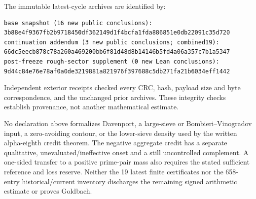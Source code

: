 \documentclass[11pt,a4paper]{article}
\theoremstyle{definition}
\theoremstyle{remark}
\begin{document}
The immutable latest-cycle archives are identified by:
\begin{lstlisting}
base snapshot (16 new public conclusions):
3b88e4f9367fb2b9718450df362149d1f4bcfa1fda886851e0db22091c35d720
continuation addendum (3 new public conclusions; combined19):
66dc5eecb878c78a260a469200bb6f81d48d8b14146b5fd4a06a357c7b1a5347
post-freeze rough-sector supplement (0 new Lean conclusions):
9d44c84e76e78af0a0de3219881a821976f397688c5db271fa21b6034eff1442
\end{lstlisting}
Independent exterior receipts checked every CRC, hash, payload size and
byte correspondence, and the unchanged prior archives. These integrity
checks establish provenance, not another mathematical estimate.

No declaration above formalizes Davenport, a large-sieve or
Bombieri--Vinogradov input, a zero-avoiding contour, or the lower-sieve
density used by the written alpha-eighth credit theorem. The negative
aggregate credit has a separate qualitative, unevaluated/ineffective
onset and a still uncontrolled complement. A one-sided transfer to a
positive prime-pair mass also requires the stated sufficient reference
and loss reserve. Neither the 19 latest finite certificates nor the
658-entry historical/current inventory discharges the remaining signed
arithmetic estimate or proves Goldbach.
\endgroup



\clearpage
\end{document}
